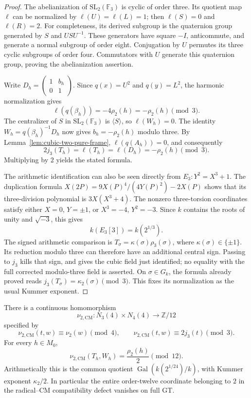 \begin{proof}
The abelianization of $\mathrm{SL}_2(\mathbb F_3)$ is cyclic of
order three.  Its quotient map $\ell$ can be normalized by
$\ell(U)=\ell(L)=1$; then
$\ell(S)=0$ and $\ell(R)=2$.
For completeness, its derived subgroup is the quaternion group
generated by $S$ and $USU^{-1}$.
These generators have square $-I$, anticommute, and generate
a normal subgroup of order eight.  Conjugation by $U$ permutes
its three cyclic subgroups of order four.  Commutators with $U$
generate this quaternion group, proving the abelianization
assertion.

Write $D_h=\left(\begin{smallmatrix}1&b_h\\0&1\end{smallmatrix}\right)$.
Since $q(x)=U^2$ and $q(y)=L^2$, the harmonic normalization gives
\[
 \ell(q(\beta_h))=-4\rho_2(h)=-\rho_2(h)\pmod3.
\]
The centralizer of $S$ in $\mathrm{SL}_2(\mathbb F_3)$ is
$\langle S\rangle$, so $\ell(W_h)=0$.  The identity
$W_h=q(\beta_h)^{-1}D_h$ now gives
$b_h=-\rho_2(h)$ modulo three.
By Lemma~\ref{lem:cubic-two-pure-frame},
$\ell(q(A_h))=0$, and consequently
\[
 2j_3(T_h)=\ell(T_h)=\ell(D_h)
       =-\rho_2(h)\pmod3 .
\]
Multiplying by $2$ yields the stated formula.

The arithmetic identification can also be seen directly from
$E_3:Y^2=X^3+1$.  The duplication formula
$X(2P)=9X(P)^4/(4Y(P)^2)-2X(P)$ shows that
its three-division polynomial is
$3X(X^3+4)$.  The nonzero three-torsion coordinates satisfy
either $X=0$, $Y=\pm1$, or
$X^3=-4$, $Y^2=-3$.
Since $k$ contains the roots of unity and $\sqrt{-3}$, this gives
\[
 k(E_3[3])=k(2^{1/3}).
\]
The signed arithmetic comparison is $T_\sigma=\kappa(\sigma)
\rho_3(\sigma)$, where $\kappa(\sigma)\in\{\pm1\}$.
Its reduction modulo three can therefore have an additional
central sign.  Passing to $j_3$ kills that sign, and gives the
cubic field just identified; no equality with the full corrected
modulo-three field is asserted.
On $\sigma\in G_k$, the formula already proved reads
$j_3(T_\sigma)=\kappa_2(\sigma)\pmod3$.
This fixes its normalization as the usual Kummer exponent.
\end{proof}

\begin{corollary}\label{cor:complete-two-compatibility}
There is a continuous homomorphism
\[
 \nu_{2,\mathrm{CM}}:N_3(4)\times N_4(4)
          \longrightarrow\mathbb Z/12
\]
specified by
\[
 \nu_{2,\mathrm{CM}}(t,w)\equiv\nu_2(w)\pmod4,\qquad
 \nu_{2,\mathrm{CM}}(t,w)\equiv2j_3(t)\pmod3 .
\]
For every $h\in M_0$,
\[
 \nu_{2,\mathrm{CM}}(T_h,W_h)=\frac{\rho_2(h)}2\pmod{12}.
\]
Arithmetically this is the common quotient
$\operatorname{Gal}(k(2^{1/24})/k)$, with Kummer exponent
$\kappa_2/2$.
In particular the entire order-twelve coordinate belonging to
$2$ in the radical--CM compatibility defect vanishes on full GT.
\end{corollary}

